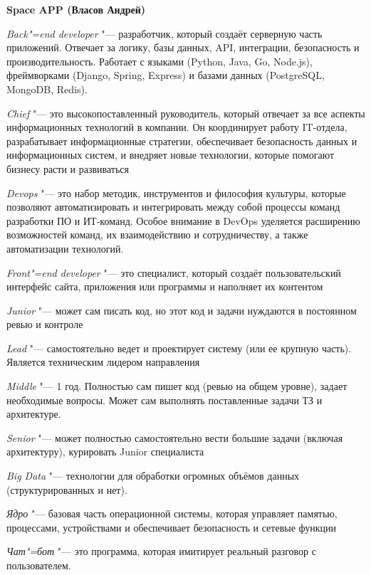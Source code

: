 \documentclass{article}
\begin{document}
\begin{center}
    \textbf{Space APP (Власов Андрей)}
\end{center}

\textit{Back"=end developer} "--- разработчик, который создаёт серверную часть приложений. Отвечает за логику, базы данных, API, интеграции, безопасность и производительность. Работает с языками (Python, Java, Go, Node.js), фреймворками (Django, Spring, Express) и базами данных (PostgreSQL, MongoDB, Redis).

\textit{Chief} "--- это высокопоставленный руководитель, который отвечает за все аспекты информационных технологий в компании. Он координирует работу IT-отдела, разрабатывает информационные стратегии, обеспечивает безопасность данных и информационных систем, и внедряет новые технологии, которые помогают бизнесу расти и развиваться

\textit{Devops} "--- это набор методик, инструментов и философия культуры, которые позволяют автоматизировать и интегрировать между собой процессы команд разработки ПО и ИТ‑команд. Особое внимание в DevOps уделяется расширению возможностей команд, их взаимодействию и сотрудничеству, а также автоматизации технологий.

\textit{Front"=end developer} "--- это специалист, который создаёт пользовательский интерфейс сайта, приложения или программы и наполняет их контентом

\textit{Junior} "--- может сам писать код, но этот код и задачи нуждаются в постоянном ревью и контроле

\textit{Lead} "--- самостоятельно ведет и проектирует систему (или ее крупную часть). Является техническим лидером направления

\textit{Middle} "--- 1 год. Полностью сам пишет код (ревью на общем уровне), задает необходимые вопросы. Может сам выполнять поставленные задачи ТЗ и архитектуре.

\textit{Senior} "--- может полностью самостоятельно вести большие задачи (включая архитектуру), курировать Junior специалиста

\textit{Big Data} "--- технологии для обработки огромных объёмов данных (структурированных и нет).

\textit{Ядро} "--- базовая часть операционной системы, которая управляет памятью, процессами, устройствами и обеспечивает безопасность и сетевые функции

\textit{Чат"=бот} "--- это программа, которая имитирует реальный разговор с пользователем.
\end{document}
